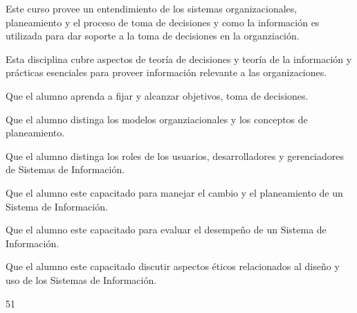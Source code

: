\begin{syllabus}


\begin{justification}
Este curso provee un entendimiento de los sistemas organizacionales, planeamiento y el proceso de toma de decisiones y como la información es utilizada para dar soporte a la toma de decisiones en la organziación.

Esta disciplina cubre aspectos de teoría de decisiones y teoría de la información y prácticas esenciales para proveer información relevante a las organizaciones.
\end{justification}

\begin{goals}
\item Que el alumno aprenda a fijar y alcanzar objetivos, toma de decisiones.
\item Que el alumno distinga los modelos organziacionales y los conceptos de planeamiento.
\item Que el alumno distinga los roles de los usuarios, desarrolladores y gerenciadores de Sistemas de Información.
\item Que el alumno este capacitado para manejar el cambio y el planeamiento de un Sistema de Información.
\item Que el alumno este capacitado para evaluar el desempeño de un Sistema de Información.
\item Que el alumno este capacitado discutir aspectos éticos relacionados al diseño y uso de los Sistemas de Información.
\end{goals}

\begin{outcomes}
\end{outcomes}

\begin{unit}{\LUONESIXDef}{\LUONESIXBib}{5}{1}
   \begin{topics}
      \item \OMCNINETopicTWOxNINExSEVEN
      \item \TDSONETopicTHREExONExSIX
   \end{topics}
	\LUONESIXGoal
\end{unit}


\end{syllabus}
